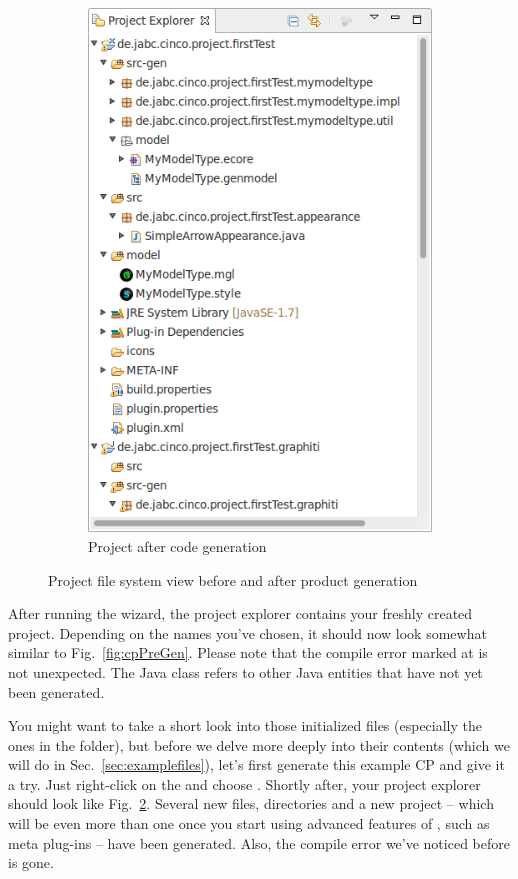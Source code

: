 \documentclass[a4paper,american,12pt]{scrreprt}
\begin{document}
\begin{figure}
\begin{subfigure}[t]{0.40\textwidth}
		\includegraphics[width=\textwidth]{screenshots/example-cp-postgen.png}
		\caption{Project after code generation}
		\label{fig:cpPostGen}
	\end{subfigure}
	\caption{Project file system view before and after \cinco{} product generation}
\end{figure}

After running the wizard, the project explorer contains your freshly created
project. Depending on the names you've chosen, it should now look somewhat
similar to Fig.~\ref{fig:cpPreGen}. Please note that the compile error marked at
 is not unexpected. The Java class refers to
other Java entities that have not yet been generated. 

You might want to take a short look into those initialized files (especially the ones in the
 folder), but before we delve more deeply
into their contents (which we will do
in Sec.~\ref{sec:examplefiles}), let's first generate this example CP and give
it a try. Just right-click on the \footnotemark{} and
choose . Shortly after, your project explorer should
look like Fig.~\ref{fig:cpPostGen}. Several new files, directories and a new
project -- which will be even more than one once you start using advanced
features of \cinco{}, such as meta plug-ins -- have been generated. Also, the
compile error we've noticed before is gone. 
\end{document}
